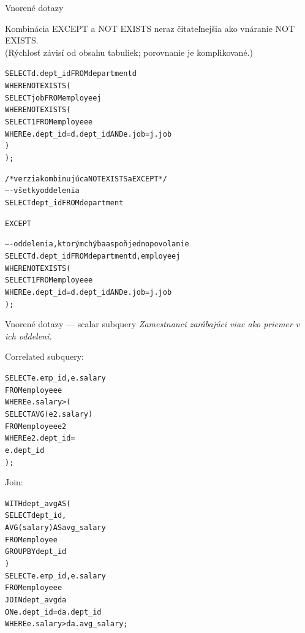 \documentclass[12pt]{beamer}
\def\blue#1{\textcolor{Cerulean}{#1}}
\begin{document}
\begin{frame}[fragile]{Vnorené dotazy}
\begin{scriptsize}
Kombinácia EXCEPT a NOT EXISTS neraz čitateľnejšia ako vnáranie NOT EXISTS.\\
(Rýchlosť závisí od obsahu tabuliek; porovnanie je komplikované.)
\medskip

\begin{alltt}
SELECT d.dept_id FROM department d
    WHERE NOT EXISTS (
      SELECT job FROM employee j
      WHERE NOT EXISTS (
          SELECT 1 FROM employee e
          WHERE e.dept_id = d.dept_id AND e.job = j.job
      )
    );

/* verzia kombinujúca NOT EXISTS a EXCEPT */
---- všetky oddelenia
SELECT dept_id FROM department

EXCEPT

---- oddelenia, ktorým chýba aspoň jedno povolanie
SELECT d.dept_id FROM department d, employee j
WHERE NOT EXISTS (
    SELECT 1 FROM employee e
    WHERE e.dept_id = d.dept_id AND e.job = j.job
);
\end{alltt}
\end{scriptsize}
\end{frame}

\begin{frame}[fragile]{Vnorené dotazy --- scalar subquery}
\footnotesize
\emph{Zamestnanci zarábajúci viac ako priemer v ich oddelení.}\\[7mm]
\begin{minipage}{.4\pdfpagewidth}
Correlated subquery:
\footnotesize
\begin{alltt}
SELECT e.emp_id, e.salary
FROM employee e
WHERE \blue{e.salary >} (
  SELECT AVG(e2.salary)
  FROM employee e2
  WHERE e2.dept_id =
    e.dept_id
);



\end{alltt}
\end{minipage}
\hfill\vline\hfill
\begin{minipage}{.4\pdfpagewidth}
Join:
\footnotesize
\begin{alltt}
WITH dept_avg AS (
  SELECT dept_id,
    AVG(salary) AS avg_salary
  FROM employee
  GROUP BY dept_id
)
SELECT e.emp_id, e.salary
FROM employee e
  JOIN dept_avg da
    ON e.dept_id = da.dept_id
WHERE \blue{e.salary >} da.avg_salary;
\end{alltt}
\end{minipage}
\end{frame}
\end{document}
